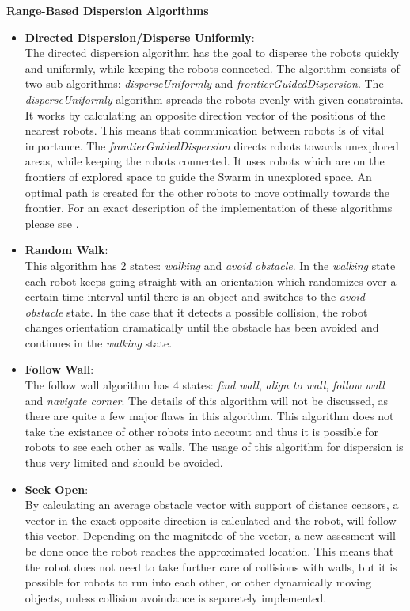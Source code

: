 	\textbf{Range-Based Dispersion Algorithms}
	\begin{itemize}
		\item \textbf{Directed Dispersion/Disperse Uniformly}\cite{mclurkin2007distributed}:\\
			The directed dispersion algorithm has the goal to disperse the robots quickly and uniformly, while keeping the robots connected. The algorithm consists of two sub-algorithms: \emph{disperseUniformly} and \emph{frontierGuidedDispersion}. The \emph{disperseUniformly} algorithm spreads the robots evenly with given constraints. It works by calculating an opposite direction vector of the positions of the nearest robots. This means that communication between robots is of vital importance. The \emph{frontierGuidedDispersion} directs robots towards unexplored areas, while keeping the robots connected. It uses robots which are on the frontiers of explored space to guide the Swarm in unexplored space. An optimal path is created for the other robots to move optimally towards the frontier. For an exact description of the implementation of these algorithms please see \cite{mclurkin2007distributed}.
		\item \textbf{Random Walk}\cite{morlok2007dispersing}:\\
			This algorithm has 2 states: \emph{walking} and \emph{avoid obstacle}. In the \emph{walking} state each robot keeps going straight with an orientation which randomizes over a certain time interval until there is an object and switches to the \emph{avoid obstacle} state. In the case that it detects a possible collision, the robot changes orientation dramatically until the obstacle has been avoided and continues in the \emph{walking} state.
		\item \textbf{Follow Wall}\cite{morlok2007dispersing}:\\
			The follow wall algorithm has 4 states: \emph{find wall}, \emph{align to wall}, \emph{follow wall} and \emph{navigate corner}. The details of this algorithm will not be discussed, as there are quite a few major flaws in this algorithm. This algorithm does not take the existance of other robots into account and thus it is possible for robots to see each other as walls. The usage of this algorithm for dispersion is thus very limited and should be avoided.
		\item \textbf{Seek Open}\cite{morlok2007dispersing}:\\
			By calculating an average obstacle vector with support of distance censors, a vector in the exact opposite direction is calculated and the robot, will follow this vector. Depending on the magnitede of the vector, a new assesment will be done once the robot reaches the approximated location. This means that the robot does not need to take further care of collisions with walls, but it is possible for robots to run into each other, or other dynamically moving objects, unless collision avoindance is separetely implemented.

\end{itemize}
